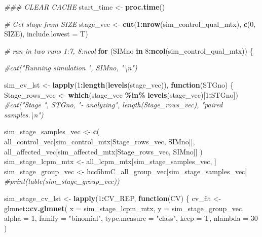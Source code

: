 \documentclass[
]{book}
\newenvironment{Shaded}{\begin{snugshade}}{\end{snugshade}}
\newcommand{\CommentTok}[1]{\textcolor[rgb]{0.56,0.35,0.01}{\textit{#1}}}
\newcommand{\ControlFlowTok}[1]{\textcolor[rgb]{0.13,0.29,0.53}{\textbf{#1}}}
\newcommand{\DataTypeTok}[1]{\textcolor[rgb]{0.13,0.29,0.53}{#1}}
\newcommand{\DecValTok}[1]{\textcolor[rgb]{0.00,0.00,0.81}{#1}}
\newcommand{\KeywordTok}[1]{\textcolor[rgb]{0.13,0.29,0.53}{\textbf{#1}}}
\newcommand{\NormalTok}[1]{#1}
\newcommand{\OperatorTok}[1]{\textcolor[rgb]{0.81,0.36,0.00}{\textbf{#1}}}
\newcommand{\StringTok}[1]{\textcolor[rgb]{0.31,0.60,0.02}{#1}}
\begin{document}
\begin{Shaded}
\begin{Highlighting}[]
\CommentTok{\#\#\# CLEAR CACHE}
\NormalTok{start\_time <{-}}\StringTok{ }\KeywordTok{proc.time}\NormalTok{()}

\CommentTok{\# Get stage from SIZE}
\NormalTok{stage\_vec <{-}}\StringTok{ }\KeywordTok{cut}\NormalTok{(}\DecValTok{1}\OperatorTok{:}\KeywordTok{nrow}\NormalTok{(sim\_control\_qual\_mtx), }\KeywordTok{c}\NormalTok{(}\DecValTok{0}\NormalTok{, SIZE), }\DataTypeTok{include.lowest =}\NormalTok{ T)}

\CommentTok{\# ran in two runs 1:7, 8:ncol}
\ControlFlowTok{for}\NormalTok{ (SIMno }\ControlFlowTok{in} \DecValTok{8}\OperatorTok{:}\KeywordTok{ncol}\NormalTok{(sim\_control\_qual\_mtx)) \{}

  \CommentTok{\#cat("Running simulation ", SIMno, "\textbackslash{}n")}

\NormalTok{  sim\_cv\_lst <{-}}\StringTok{ }\KeywordTok{lapply}\NormalTok{(}\DecValTok{1}\OperatorTok{:}\KeywordTok{length}\NormalTok{(}\KeywordTok{levels}\NormalTok{(stage\_vec)), }\ControlFlowTok{function}\NormalTok{(STGno) \{}
\NormalTok{    Stage\_rows\_vec <{-}}\StringTok{ }\KeywordTok{which}\NormalTok{(stage\_vec }\OperatorTok{\%in\%}\StringTok{ }\KeywordTok{levels}\NormalTok{(stage\_vec)[}\DecValTok{1}\OperatorTok{:}\NormalTok{STGno])}
    \CommentTok{\#cat("Stage ", STGno, "{-} analyzing", length(Stage\_rows\_vec), "paired samples.\textbackslash{}n")}

\NormalTok{    sim\_stage\_samples\_vec <{-}}\StringTok{ }\KeywordTok{c}\NormalTok{(}
\NormalTok{      all\_control\_vec[sim\_control\_mtx[Stage\_rows\_vec, SIMno]],}
\NormalTok{      all\_affected\_vec[sim\_affected\_mtx[Stage\_rows\_vec, SIMno]]}
\NormalTok{    )}
\NormalTok{    sim\_stage\_lcpm\_mtx <{-}}\StringTok{ }\NormalTok{all\_lcpm\_mtx[sim\_stage\_samples\_vec, ]}
\NormalTok{    sim\_stage\_group\_vec <{-}}\StringTok{ }\NormalTok{hcc5hmC\_all\_group\_vec[sim\_stage\_samples\_vec]}
    \CommentTok{\#print(table(sim\_stage\_group\_vec))}

\NormalTok{    sim\_stage\_cv\_lst <{-}}\StringTok{ }\KeywordTok{lapply}\NormalTok{(}\DecValTok{1}\OperatorTok{:}\NormalTok{CV\_REP, }\ControlFlowTok{function}\NormalTok{(CV) \{}
\NormalTok{      cv\_fit <{-}}\StringTok{ }\NormalTok{glmnet}\OperatorTok{::}\KeywordTok{cv.glmnet}\NormalTok{(}
        \DataTypeTok{x =}\NormalTok{ sim\_stage\_lcpm\_mtx,}
        \DataTypeTok{y =}\NormalTok{ sim\_stage\_group\_vec,}
        \DataTypeTok{alpha =} \DecValTok{1}\NormalTok{,}
        \DataTypeTok{family =} \StringTok{"binomial"}\NormalTok{,}
        \DataTypeTok{type.measure =} \StringTok{"class"}\NormalTok{,}
        \DataTypeTok{keep =}\NormalTok{ T,}
        \DataTypeTok{nlambda =} \DecValTok{30}
\NormalTok{      )}


\end{Highlighting}
\end{Shaded}
\end{document}
